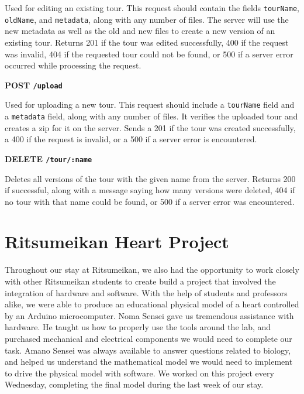 \documentclass[a4paper, 10pt, american, titlepage]{article}
\newenvironment{indented}[1]%
{\begin{list}{}%
	{\setlength{\leftmargin}{#1}}%
	\item[]%
}
{\end{list}}
\begin{document}
\begin{indented}{1cm}
	Used for editing an existing tour. This request should contain the fields
	\texttt{tourName}, \texttt{oldName}, and \texttt{metadata}, along with any
	number of files.  The server will use the new metadata as well as the old
	and new files to create a new version of an existing tour. Returns 201 if
	the tour was edited successfully, 400 if the request was invalid, 404 if the
	requested tour could not be found, or 500 if a server error occurred while
	processing the request.
\end{indented}

\noindent\textbf{POST \texttt{/upload}}

\begin{indented}{1cm}
	Used for uploading a new tour. This request should include a
	\texttt{tourName} field and a \texttt{metadata} field, along with any number
	of files. It verifies the uploaded tour and creates a zip for it on the
	server. Sends a 201 if the tour was created successfully, a 400 if the
	request is invalid, or a 500 if a server error is encountered.
\end{indented}

\noindent\textbf{DELETE \texttt{/tour/:name}}

\begin{indented}{1cm}
	Deletes all versions of the tour with the given name from the server.
	Returns 200 if successful, along with a message saying how many versions
	were deleted, 404 if no tour with that name could be found, or 500 if a
	server error was encountered.
\end{indented}

\clearpage

\section{Ritsumeikan Heart Project}
\label{sec:ritsumeikanHeartProject}

Throughout our stay at Ritsumeikan, we also had the opportunity to work closely
with other Ritsumeikan students to create build a project that involved the
integration of hardware and software. With the help of students and professors
alike, we were able to produce an educational physical model of a heart
controlled by an Arduino microcomputer. Noma Sensei gave us tremendous
assistance with hardware. He taught us how to properly use the tools around the
lab, and purchased mechanical and electrical components we would need to
complete our task. Amano Sensei was always available to answer questions related
to biology, and helped us understand the mathematical model we would need to
implement to drive the physical model with software. We worked on this project
every Wednesday, completing the final model during the last week of our stay.
\end{document}
